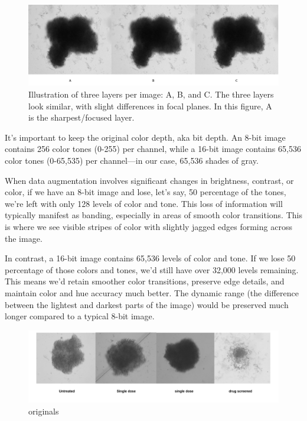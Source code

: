 \documentclass[12pt,twoside,a4paper,parskip]{scrbook} %
\begin{document}
\begin{figure}[H]
  \centering
  \includegraphics[scale=0.46]{figures/threes.png} 
  \caption{Illustration of three layers per image: A, B, and C. The three layers look similar, with slight differences in focal planes. In this figure, A is the sharpest/focused layer.}
  \label{fig:Threes}
\end{figure}

It’s important to keep the original color depth, aka bit depth. An 8-bit image contains 256 color tones (0-255) per channel, while a 16-bit image contains 65,536 color tones (0-65,535) per channel—in our case, 65,536 shades of gray.

When data augmentation involves significant changes in brightness, contrast, or color, if we have an 8-bit image and lose, let’s say, 50 percentage of the tones, we’re left with only 128 levels of color and tone. This loss of information will typically manifest as banding, especially in areas of smooth color transitions. This is where we see visible stripes of color with slightly jagged edges forming across the image.

In contrast, a 16-bit image contains 65,536 levels of color and tone. If we lose 50 percentage of those colors and tones, we’d still have over 32,000 levels remaining. This means we’d retain smoother color transitions, preserve edge details, and maintain color and hue accuracy much better. The dynamic range (the difference between the lightest and darkest parts of the image) would be preserved much longer compared to a typical 8-bit image.

\begin{figure}[H]
  \centering
  \includegraphics[scale=0.8]{figures/originals.pdf} 
  \caption{originals}
  \label{fig:originals}
\end{figure}
\end{document}
